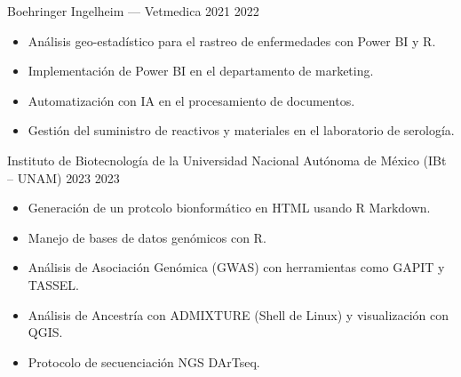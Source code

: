 \documentclass{simplecv}
\begin{document}
    {Boehringer Ingelheim --- Vetmedica}
    {}
    {2021}
    {2022}
    {%
        \vspace{-11pt}
        \begin{itemize}[leftmargin=*]
        \setlength{\itemsep}{0cm}
            \item Análisis geo-estadístico para el rastreo de enfermedades con Power BI y R.
            \item Implementación de Power BI en el departamento de marketing.
            \item Automatización con IA en el procesamiento de documentos.
            \item Gestión del suministro de reactivos y materiales en el laboratorio de serología.
        \end{itemize}
    }


    {Instituto de Biotecnología de la Universidad Nacional Autónoma de México (IBt -- UNAM)}
    {}
    {2023}
    {2023}
    {%
        \vspace{-11pt}
        \begin{itemize}[leftmargin=*]
        \setlength{\itemsep}{0cm}
          \item Generación de un protcolo bionformático en HTML usando R Markdown.
          \item Manejo de bases de datos genómicos con R.
          \item Análisis de Asociación Genómica (GWAS) con herramientas como GAPIT y TASSEL.
          \item Análisis de Ancestría con ADMIXTURE (Shell de Linux) y visualización con QGIS.
          \item Protocolo de secuenciación NGS DArTseq.
        \end{itemize}
    }
    
\end{document}
